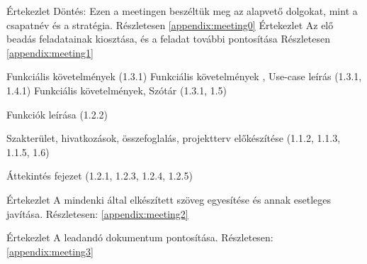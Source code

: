 \documentclass[../../projlab]{subfiles}
\begin{document}

\clearpage

\begin{naplo}
	{ Értekezlet
		\newline Döntés: Ezen a meetingen beszéltük meg az alapvető dolgokat, mint a csapatnév és a stratégia.
		Részletesen \ref{appendix:meeting0}
	}
	{ Értekezlet
		\newline Az elő beadás feladatainak kiosztása, és a feladat további pontosítása
		Részletesen \ref{appendix:meeting1}
	}


	{ 
		Funkciális követelmények (1.3.1)
	}
	{ 
		Funkciális követelmények , Use-case leírás (1.3.1, 1.4.1)
	}
	{ 
		Funkciális követelmények, Szótár (1.3.1, 1.5)
	}



	{ 
		Funkciók leírása (1.2.2)
	}

	{ 
		Szakterület, hivatkozások, összefoglalás, projektterv előkészítése (1.1.2, 1.1.3, 1.1.5, 1.6)
	}

	{ 
		Áttekintés fejezet  (1.2.1, 1.2.3, 1.2.4, 1.2.5)
	}

	{ 
		Értekezlet
		\newline A mindenki által elkészített szöveg egyesítése és annak esetleges javítása.
		\newline
		Részletesen: \ref{appendix:meeting2}
	}


	{ 
		Értekezlet \newline 
		A leadandó dokumentum pontosítása.
		\newline
		Részletesen: \ref{appendix:meeting3}
	}

\end{naplo}

\begin{toappendix}



\end{toappendix}
\end{document}
